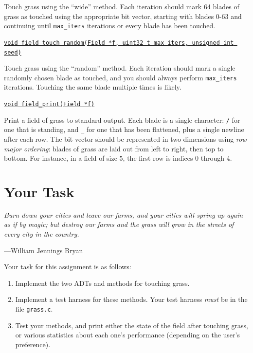 \documentclass[11pt]{article}
\begin{document}
Touch grass using the ``wide'' method. Each iteration should mark 64 blades of grass as touched using the appropriate bit vector, starting with blades 0-63 and continuing until \texttt{max\_iters} iterations or every blade has been touched.
\medskip

\underline{\texttt{void field\_touch\_random(Field *f, uint32\_t max\_iters, unsigned int seed)}}

Touch grass using the ``random'' method. Each iteration should mark a single randomly chosen blade as touched, and you should always perform \texttt{max\_iters} iterations. Touching the same blade multiple times is likely.
\medskip

\underline{\texttt{void field\_print(Field *f)}}

Print a field of grass to standard output. Each blade is a single character: \texttt{/} for one that is standing, and \texttt{\_} for one that has been flattened, plus a single newline after each row. The bit vector should be represented in two dimensions using \emph{row-major ordering}: blades of grass are laid out from left to right, then top to bottom. For instance, in a field of size 5, the first row is indices 0 through 4.

\setlength{\parindent}{17pt}
\setlength{\parskip}{0pt plus1pt}

\section{Your Task}

\setlength{\epigraphwidth}{0.53\textwidth}
\epigraph{\emph{Burn down your cities and leave our farms, and your cities will spring up again as if by magic; but destroy our farms and the grass will grow in the streets of every city in the country.}}{---William Jennings Bryan}
\setlength{\epigraphwidth}{0.76\textwidth}

\noindent
Your task for this assignment is as follows:

\begin{enumerate}
    \item Implement the two ADTs and methods for touching grass.
    \item Implement a test harness for these methods. Your test harness \emph{must} be in the file \texttt{grass.c}.
    \item Test your methods, and print either the state of the field after touching grass, or various statistics about each one's performance (depending on the user's preference).
\end{enumerate}
\end{document}
